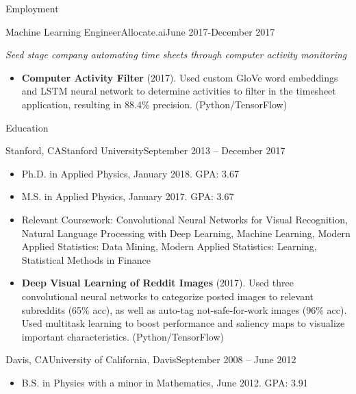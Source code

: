 \documentclass[]{mcdowellcv}
\begin{document}
\begin{cvsection}{Employment}
		\begin{cvsubsection}{Machine Learning Engineer}{Allocate.ai}{June 2017-December 2017}
		         \vspace{1mm}		
			\centerline{\it Seed stage company automating time sheets through computer activity monitoring}		
			\begin{itemize}
			\vspace{-1mm}		
				\item \textbf{Computer Activity Filter} (2017).  Used custom GloVe word embeddings and LSTM neural network to determine activities to filter in the timesheet application, resulting in 88.4\% precision. (Python/TensorFlow)
			\end{itemize}
		\end{cvsubsection}
	
	\end{cvsection}			
	
	\begin{cvsection}{Education}
		\begin{cvsubsection}{Stanford, CA}{Stanford University}{September 2013 -- December 2017}
			\begin{itemize}
				\item Ph.D. in Applied Physics, January 2018. GPA: 3.67
				\item M.S. in Applied Physics, January 2017. GPA: 3.67
				\item Relevant Coursework: Convolutional Neural Networks for Visual Recognition, Natural Language Processing with Deep Learning, Machine Learning, Modern Applied Statistics: Data Mining, Modern Applied Statistics: Learning,  Statistical Methods in Finance
				\item \textbf{Deep Visual Learning of Reddit Images} (2017).  Used three convolutional neural networks to categorize posted images to relevant subreddits (65\% acc), as well as auto-tag not-safe-for-work images (96\% acc). Used multitask learning to boost performance and saliency maps to visualize important characteristics. (Python/TensorFlow)
			\end{itemize}
		\end{cvsubsection}
		
		\begin{cvsubsection}{Davis, CA}{University of California, Davis}{September 2008 -- June 2012}
			\begin{itemize}
				\item B.S. in Physics with a minor in Mathematics, June 2012. GPA: 3.91
			\end{itemize}
		\end{cvsubsection}
	\end{cvsection}
	
\end{document}
